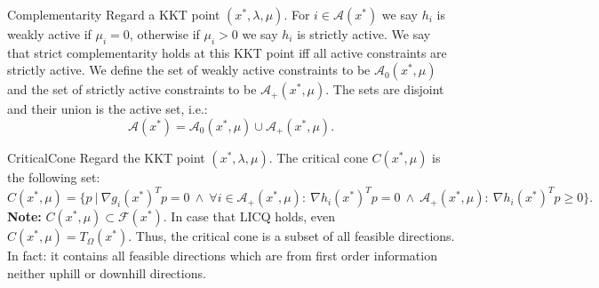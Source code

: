 \begin{theo}[Complementarity]{Complementarity}
    Regard a KKT point $(x^*, \lambda, \mu)$. For $i \in \mathcal{A}(x^*)$ we say $h_i$ is weakly active if $\mu_i = 0$, otherwise if $\mu_i > 0$ we say $h_i$ is strictly active. We say that strict complementarity holds at this KKT point iff all active constraints are strictly active. We define the set of weakly active constraints to be $\mathcal{A}_0(x^*, \mu)$ and the set of strictly active constraints to be $\mathcal{A}_+(x^*, \mu)$. The sets are disjoint and their union is the active set, i.e.:
    \begin{equation*}
        \mathcal{A}(x^*) = \mathcal{A}_0(x^*, \mu) \cup \mathcal{A}_+(x^*, \mu).
    \end{equation*}
    \vspace{-0.5cm}
\end{theo}

\begin{theo}{CriticalCone}
    Regard the KKT point $(x^*, \lambda, \mu)$. The critical cone $C(x^*, \mu)$ is the following set:
    \begin{equation*}
        C(x^*, \mu) = \{p \ | \ \nabla g_i(x^*)^Tp = 0 \ \land \ \forall i \in \mathcal{A}_+(x^*, \mu): \ \nabla h_i(x^*)^Tp = 0 \ \land \ \mathcal{A}_+(x^*, \mu): \ \nabla h_i(x^*)^Tp \geq 0\}.
    \end{equation*}
    \textbf{Note:} $C(x^*, \mu) \subset \mathcal{F}(x^*)$. In case that LICQ holds, even $C(x^*, \mu) = T_{\Omega}(x^*)$. Thus, the critical
    cone is a subset of all feasible directions. In fact: it contains all feasible directions which are from first order information neither uphill or downhill directions.
\end{theo}